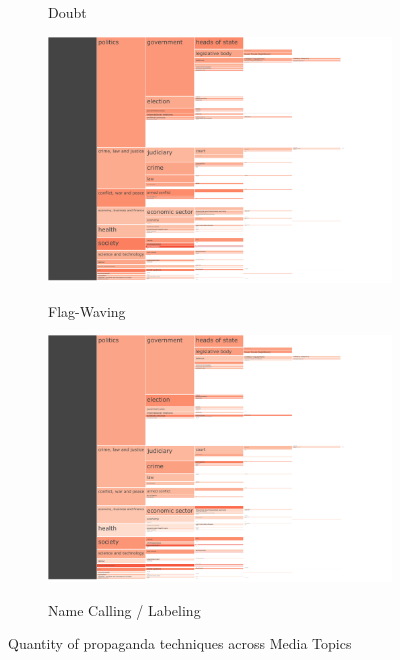 \begin{figure}[!htbp]
\begin{subfigure}{0.45\textwidth}
		\caption{Doubt}
            \label{fig:baly_iptc_weighted_prop_tech_Doubt}
	\end{subfigure}
	\begin{subfigure}{0.45\textwidth}
		\href{https://martinomensio.github.io/phd-project/figures/baly_iptc_weighted_prop_tech.html#Flag-Waving}{\includegraphics[trim={2.65cm 0cm 2.8cm 0cm},clip,width=\linewidth]{figures/baly_iptc_weighted_prop_tech_Flag-Waving.pdf}}
		\caption{Flag-Waving}
            \label{fig:baly_iptc_weighted_prop_tech_Flag-Waving}
	\end{subfigure}
	\begin{subfigure}{0.45\textwidth}
		\href{https://martinomensio.github.io/phd-project/figures/baly_iptc_weighted_prop_tech.html#Name_Calling-Labeling}{\includegraphics[trim={2.65cm 0cm 2.8cm 0cm},clip,width=\linewidth]{figures/baly_iptc_weighted_prop_tech_Name_Calling-Labeling.pdf}}
		\caption{Name Calling / Labeling}
            \label{fig:baly_iptc_weighted_prop_tech_Name_Calling-Labeling}
	\end{subfigure}
	
    \caption{Quantity of propaganda techniques across Media Topics}
    \label{fig:baly_iptc_weighted_prop_tech}
\end{figure}

